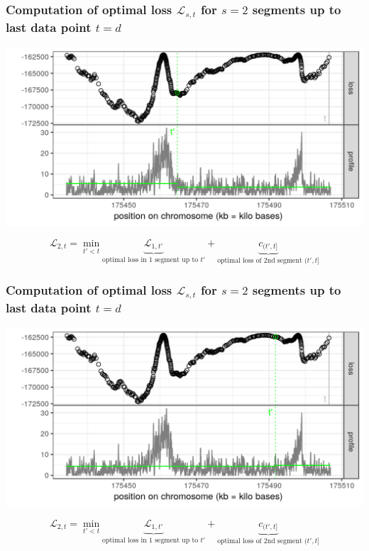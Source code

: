 \begin{frame}
\frametitle{Computation of optimal loss $\mathcal L_{s, t}$
 for $s=2$ segments up to last data point $t = d$}
  \includegraphics[width=\textwidth]{figure-dp-5.png}

$$
\mathcal L_{2, t} =
\min_{
  t' < t
}
\underbrace{
  \mathcal L_{1, t'}
}_{
  \text{optimal loss in 1 segment up to $t'$}
}
+
\underbrace{
  c_{(t', t]}
}_{
  \text{optimal loss of 2nd segment $(t', t]$}
}
$$

\end{frame}
 
\begin{frame}
\frametitle{Computation of optimal loss $\mathcal L_{s, t}$
 for $s=2$ segments up to last data point $t = d$}
  \includegraphics[width=\textwidth]{figure-dp-6.png}

$$
\mathcal L_{2, t} =
\min_{
  t' < t
}
\underbrace{
  \mathcal L_{1, t'}
}_{
  \text{optimal loss in 1 segment up to $t'$}
}
+
\underbrace{
  c_{(t', t]}
}_{
  \text{optimal loss of 2nd segment $(t', t]$}
}
$$

\end{frame}
